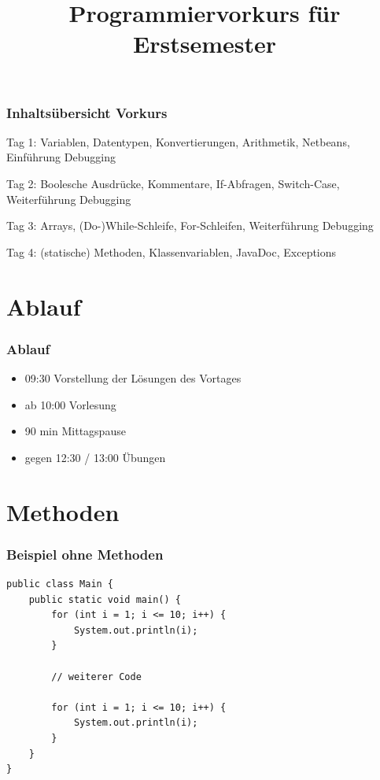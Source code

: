 \documentclass[final]{beamer}
\title{Programmiervorkurs für Erstsemester}
\begin{document}
\lstset{tabsize=4}
\lstset{basicstyle=\small}
\lstset{language=java}

\begin{frame}
  \titlepage
\end{frame}

\begin{frame}
	\frametitle{Inhaltsübersicht Vorkurs}
	\begin{itemize}
	{\color{gray}
		\item {Tag 1: Variablen, Datentypen, Konvertierungen, Arithmetik, Netbeans, Einführung Debugging}
		\item {Tag 2: Boolesche Ausdrücke, Kommentare, If-Abfragen, Switch-Case, Weiterführung Debugging}
		\item {Tag 3: Arrays, (Do-)While-Schleife, For-Schleifen, Weiterführung Debugging}
		{\color{black}
		\item {Tag 4: (statische) Methoden, Klassenvariablen, JavaDoc, Exceptions}
		}
	}
	\end{itemize}
\end{frame}

\section{Ablauf}
\begin{frame}
  \frametitle{Ablauf}
  \begin{itemize}
    \item{09:30 Vorstellung der Lösungen des Vortages}
    \item{ab 10:00 Vorlesung}
    \item{90 min Mittagspause}
    \item{gegen 12:30 / 13:00 Übungen}
  \end{itemize}
\end{frame}

\section{Methoden}
\begin{frame}[containsverbatim]
	\frametitle{Beispiel ohne Methoden}
	\begin{lstlisting}
public class Main {
	public static void main() {
		for (int i = 1; i <= 10; i++) {
			System.out.println(i);
		}
		
		// weiterer Code
		
		for (int i = 1; i <= 10; i++) {
			System.out.println(i);
		}
	}
}
	\end{lstlisting}
\end{frame}
\end{document}
